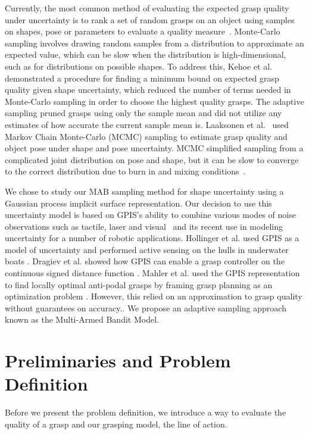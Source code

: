 \documentclass[journal,transmag]{IEEEtran}%
\begin{document}
Currently, the most common method of evaluating the expected grasp quality under uncertainty is to rank a set of random grasps on an object using  samples on shapes, pose or parameters to evaluate a quality measure~\cite{christopoulos2007handling, kehoe2012estimating, kehoe2012toward}.
Monte-Carlo sampling involves drawing random samples from a distribution to approximate an expected value\cite{caflisch1998monte}, which can be slow when the distribution is high-dimensional, such as for distributions on possible shapes.
To address this, Kehoe et al.~\cite{kehoe2012estimating} demonstrated a procedure for finding a minimum bound on expected grasp quality given shape uncertainty, which reduced the number of terms needed in Monte-Carlo sampling in order to choose the highest quality grasps. The adaptive sampling pruned grasps using only the sample mean and did not utilize any estimates of how accurate the current sample mean is. 
Laaksonen et al.~\cite{laaksonen2012probabilistic} used Markov Chain Monte-Carlo (MCMC) sampling to estimate grasp quality and object pose  under shape and pose uncertainty.
MCMC simplified sampling from a complicated joint distribution on pose and shape, but it can be slow to converge to the correct distribution due to burn in and mixing conditions~\cite{andrieu2003introduction}.

We chose to study our MAB sampling method for shape uncertainty using a Gaussian process implicit surface representation. Our decision to use this uncertainty model is based on GPIS's ability to combine various modes of noise observations such as tactile, laser and visual~\cite{rasmussen2006, williams2007, dragiev2011} and its recent use in modeling uncertainty for a number of robotic applications.
Hollinger et al. used GPIS as a model of uncertainty and performed active sensing on the hulls in underwater boats \cite{hollinger2013}.
Dragiev et al. showed how GPIS can enable a grasp controller on the continuous signed distance function \cite{dragiev2011}.
Mahler et al. used the GPIS representation to find locally optimal anti-podal grasps by framing grasp planning as an optimization problem \cite{mahler2015opt}. However, this relied on an approximation to grasp quality without guarantees on accuracy.. We propose an adaptive sampling approach known as the Multi-Armed Bandit Model. 




\section{Preliminaries and Problem Definition}
Before we present the problem definition, we introduce a way to evaluate the quality of a grasp and our grasping model, the line of action.
\end{document}
